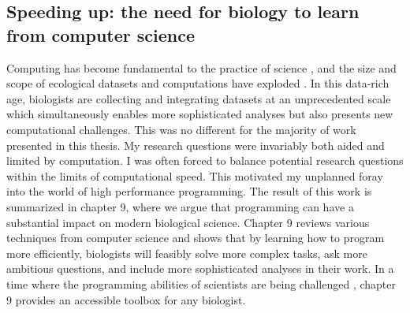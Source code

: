 \documentclass[b5paper,justified]{tufte-book} %
\begin{document}
\begin{fullwidth}
\subsection{Speeding up: the need for biology to learn from computer science} 
Computing has become fundamental to the practice of science \citep[e.g.][]{Michener2012, Wilson2012}, and the size and scope of ecological datasets and computations have exploded \citep{Bolker2013}.  In this data-rich age, biologists are collecting and integrating datasets at an unprecedented scale \citep{Petrovskii2012} which simultaneously enables more sophisticated analyses but also presents new computational challenges. This was no different for the majority of work presented in this thesis.  My research questions were invariably both aided and limited by computation. I was often forced to balance potential research questions within the limits of computational speed. This motivated my unplanned foray into the world of high performance programming. The result of this work is summarized in chapter 9, where we argue that programming can have a substantial impact on modern biological science. Chapter 9 reviews various techniques from computer science and shows that by learning how to program more efficiently, biologists will feasibly solve more complex tasks, ask more ambitious questions, and include more sophisticated analyses in their work.  In a time where the programming abilities of scientists are being challenged \citep[e.g.][]{Merali2010}, chapter 9 provides an accessible toolbox for any biologist. 


\end{fullwidth}
\end{document}
